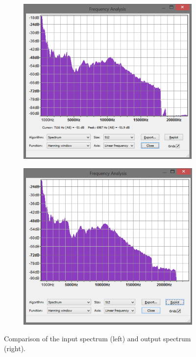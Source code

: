 \documentclass[a4paper,twoside,11pt, fleqn]{article}
\begin{document}
\begin{figure}[h]
	\begin{subfigure}[b]{0.45\textwidth}	
		\includegraphics[scale=0.5]{Images/simulation_frequencyspectrum_input.png}
	\end{subfigure}
	\begin{subfigure}[b]{0.45\textwidth}	
		\includegraphics[scale=0.5]{Images/simulation_frequencyspectrum_output.png}
	\end{subfigure}
    \caption{Comparison of the input spectrum (left) and output spectrum (right).}
\end{figure}
\clearpage
\end{document}
